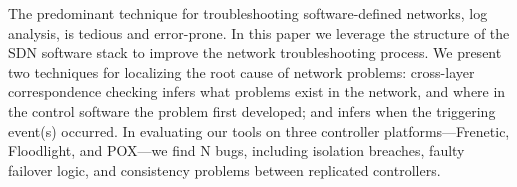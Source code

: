The predominant technique for troubleshooting software-defined networks,
log analysis, is tedious and error-prone. In this paper we leverage the
structure of the SDN software stack to improve the network troubleshooting
process. We present two techniques for localizing the root cause of network problems:
cross-layer correspondence checking infers what problems exist in the network, 
and where in the control software the problem first developed; and
\simulator{} infers when the triggering event(s) occurred. In evaluating
our tools on
three controller platforms---Frenetic, Floodlight, and POX---we find N bugs,
including isolation breaches,
faulty failover logic, and consistency problems between replicated
controllers.

